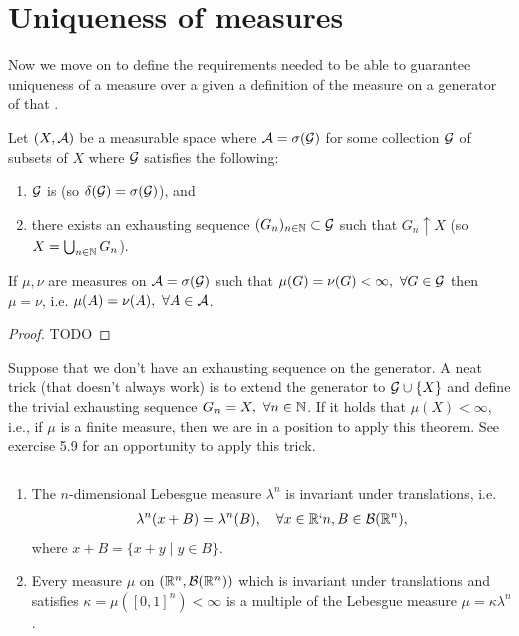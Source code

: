 \section{Uniqueness of measures}

Now we move on to define the requirements needed to be able to guarantee uniqueness of a measure over a \siga given a definition of the measure on a generator of that \siga.

\begin{thm}
	Let $(X, \mathcal{A})$ be a measurable space where $\mathcal{A} = \sigma(\mathcal{G})$ for some collection $\mathcal{G}$ of subsets of $X$ where $\mathcal{G}$ satisfies the following:
	\begin{enumerate}
		\item $\mathcal{G}$ is \istable (so $\delta(\mathcal{G}) = \sigma(\mathcal{G})$), and
		\item there exists an exhausting sequence $(G_n)_{n \in \mathbb{N}} \subset \mathcal{G}$ such that $G_n\uparrow X$ (so $X = \bigcup_{n\in\mathbb{N}}G_n$). 
	\end{enumerate}

	If $\mu, \nu$ are measures on $\mathcal{A} = \sigma(\mathcal{G})$ such that $\mu(G) = \nu(G) < \infty,\ \forall G \in \calG$ then $\mu = \nu$, i.e. $\mu(A) = \nu(A),\ \forall A \in \mathcal{A}$.
\end{thm}

\begin{proof}
	TODO
\end{proof}

Suppose that we don't have an exhausting sequence on the generator. A neat trick (that doesn't always work) is to extend the generator to $\mathcal{G} \cup \{X\}$ and define the trivial exhausting sequence $G_n = X,\ \forall n \in \mathbb{N}$. If it holds that $\mu(X) < \infty$, i.e., if $\mu$ is a finite measure, then we are in a position to apply this theorem. See exercise 5.9 for an opportunity to apply this trick.

\begin{thm}$ $\newline
	\begin{enumerate}
		\item The $n$-dimensional Lebesgue measure $\lambda^n$ is invariant under translations, i.e.
		\begin{align*}
			\lambda^n(x + B) = \lambda^n(B),\quad \forall x \in \mathbb{R}`n, B \in \mathcal{B}(\mathbb{R}^n),
		\end{align*}
		where $x + B = \{x + y \mid y \in B\}$.
		
		\item Every measure $\mu$ on $(\mathbb{R}^n, \mathcal{B}(\mathbb{R}^n))$ which is invariant under translations and satisfies $\kappa = \mu([0,1]^n) < \infty$ is a multiple of the Lebesgue measure $\mu = \kappa \lambda^n$.
	\end{enumerate}
\end{thm}

